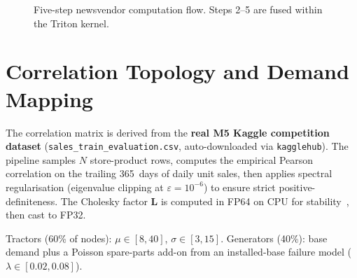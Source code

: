 \begin{figure}[H]
\centering
{}
\caption{Five-step newsvendor computation flow. Steps 2--5 are fused within the Triton kernel.}
\label{fig:mathflow}
\end{figure}

\section{Correlation Topology and Demand Mapping}\label{sec:corr}

The correlation matrix is derived from the \textbf{real M5 Kaggle competition dataset} (\texttt{sales\_train\_evaluation.csv}, auto-downloaded via \texttt{kagglehub}). The pipeline samples $N$ store-product rows, computes the empirical Pearson correlation on the trailing 365~days of daily unit sales, then applies spectral regularisation (eigenvalue clipping at $\varepsilon = 10^{-6}$) to ensure strict positive-definiteness. The Cholesky factor $\mathbf{L}$ is computed in FP64 on CPU for stability~\citep{higham2002}, then cast to FP32.

Tractors (60\% of nodes): $\mu \in [8, 40]$, $\sigma \in [3, 15]$. Generators (40\%): base demand plus a Poisson spare-parts add-on from an installed-base failure model ($\lambda \in [0.02, 0.08]$).

